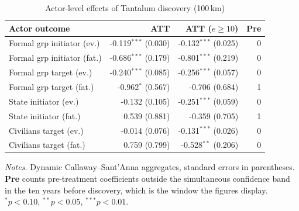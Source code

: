 \begin{table}[H]
\centering
\footnotesize
\caption{Actor-level effects of Tantalum discovery (100\,km)}
\label{tab:mech_tantalum}
\begin{tabular}{lrrr}
\toprule
\textbf{Actor outcome} & \textbf{ATT} & \textbf{ATT ($e\geq10$)} & \textbf{Pre} \\
\midrule
Formal grp initiator (ev.) & -0.119$^{***}$ (0.030) & -0.132$^{***}$ (0.025) & 0 \\
Formal grp initiator (fat.) & -0.686$^{***}$ (0.179) & -0.801$^{***}$ (0.219) & 0 \\
Formal grp target (ev.) & -0.240$^{***}$ (0.085) & -0.256$^{***}$ (0.057) & 0 \\
Formal grp target (fat.) & -0.962$^{*}$ (0.567) & -0.706 (0.684) & 1 \\
State initiator (ev.) & -0.132 (0.105) & -0.251$^{***}$ (0.059) & 0 \\
State initiator (fat.) & 0.539 (0.881) & -0.359 (0.705) & 1 \\
Civilians target (ev.) & -0.014 (0.076) & -0.131$^{***}$ (0.026) & 0 \\
Civilians target (fat.) & 0.759 (0.799) & -0.528$^{**}$ (0.206) & 0 \\
\bottomrule
\end{tabular}
\begin{minipage}{0.9\textwidth}\vspace{4pt}\scriptsize \textit{Notes.} Dynamic Callaway--Sant'Anna aggregates, standard errors in parentheses. \textbf{Pre} counts pre-treatment coefficients outside the simultaneous confidence band in the ten years before discovery, which is the window the figures display. $^{*}p<0.10$, $^{**}p<0.05$, $^{***}p<0.01$.\end{minipage}
\end{table}
